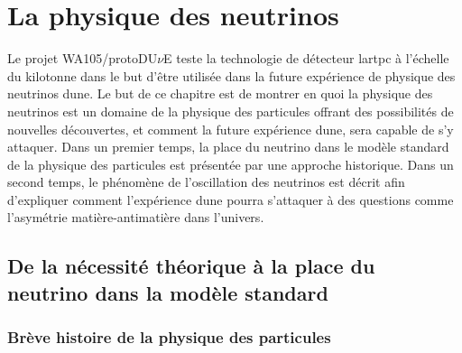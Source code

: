 \chapter{La physique des neutrinos}
    
    Le projet WA105/protoDU$\nu$E teste la technologie de détecteur \gls{lartpc} à l'échelle du kilotonne dans le but d'être utilisée dans la future expérience de physique des neutrinos \gls{dune}. Le but de ce chapitre est de montrer en quoi la physique des neutrinos est un domaine de la physique des particules offrant des possibilités de nouvelles découvertes, et comment la future expérience \gls{dune}, sera capable de s'y attaquer. Dans un premier temps, la place du neutrino dans le modèle standard de la physique des particules est présentée par une approche historique. Dans un second temps, le phénomène de l'oscillation des neutrinos est décrit afin d'expliquer comment l'expérience \gls{dune} pourra s'attaquer à des questions comme l'asymétrie matière-antimatière dans l'univers.
    
    \section{De la nécessité théorique à la place du neutrino dans la modèle standard}
    
	    \subsection{Brève histoire de la physique des particules}
	    
